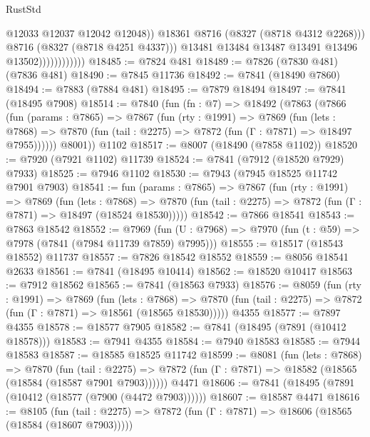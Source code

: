 \begin{lexlean}{RustStd}
\begin{coremodule}
{\begin{coremodule}
{{{{{{{{{{{{{{{{{{{{{{{{{{{{{{{{{{{{{{{{{{{{{{{{{{{{{{                                    @12033
                                    @12037
                                    @12042
                                    @12048))
                                @18361
                                @8716
                                (@8327 (@8718 @4312 @2268)))
                              @8716
                              (@8327 (@8718 @4251 @4337)))
                            @13481
                            @13484
                            @13487
                            @13491
                            @13496
                            @13502))))))))))))
@18485 := @7824 @481
@18489 := @7826 (@7830 @481) (@7836 @481)
@18490 := @7845 @11736
@18492 := @7841 (@18490 @7860)
@18494 := @7883 (@7884 @481)
@18495 := @7879 @18494
@18497 := @7841 (@18495 @7908)
@18514 := @7840
    (fun (fn : @7) =>
    @18492
      (@7863
        (@7866
          (fun (params : @7865) =>
          @7867
            (fun (rty : @1991) =>
            @7869
              (fun (lets : @7868) =>
              @7870 (fun (tail : @2275) => @7872 (fun (Γ : @7871) => @18497 @7955))))))
        @8001))
    @1102
@18517 := @8007 (@18490 (@7858 @1102))
@18520 := @7920 (@7921 @1102) @11739
@18524 := @7841 (@7912 (@18520 @7929) @7933)
@18525 := @7946 @1102
@18530 := @7943 (@7945 @18525 @11742 @7901 @7903)
@18541 := fun (params : @7865) =>
  @7867
    (fun (rty : @1991) =>
    @7869
      (fun (lets : @7868) =>
      @7870 (fun (tail : @2275) => @7872 (fun (Γ : @7871) => @18497 (@18524 @18530)))))
@18542 := @7866 @18541
@18543 := @7863 @18542
@18552 := @7969
    (fun (U : @7968) => @7970 (fun (t : @59) => @7978 (@7841 (@7984 @11739 @7859) @7995)))
@18555 := @18517 (@18543 @18552) @11737
@18557 := @7826 @18542 @18552
@18559 := @8056 @18541 @2633
@18561 := @7841 (@18495 @10414)
@18562 := @18520 @10417
@18563 := @7912 @18562
@18565 := @7841 (@18563 @7933)
@18576 := @8059
    (fun (rty : @1991) =>
    @7869
      (fun (lets : @7868) =>
      @7870 (fun (tail : @2275) => @7872 (fun (Γ : @7871) => @18561 (@18565 @18530)))))
    @4355
@18577 := @7897 @4355
@18578 := @18577 @7905
@18582 := @7841 (@18495 (@7891 (@10412 @18578)))
@18583 := @7941 @4355
@18584 := @7940 @18583
@18585 := @7944 @18583
@18587 := @18585 @18525 @11742
@18599 := @8081
    (fun (lets : @7868) =>
    @7870
      (fun (tail : @2275) =>
      @7872 (fun (Γ : @7871) => @18582 (@18565 (@18584 (@18587 @7901 @7903))))))
    @4471
@18606 := @7841 (@18495 (@7891 (@10412 (@18577 (@7900 (@4472 @7903))))))
@18607 := @18587 @4471
@18616 := @8105
    (fun (tail : @2275) => @7872 (fun (Γ : @7871) => @18606 (@18565 (@18584 (@18607 @7903)))))
}}}}}}}}}}}}}}}}}}}}}}}}}}}}}}}}}}}}}}}}}}}}}}}}}}}}}}
\end{coremodule}}
\end{coremodule}
\end{lexlean}
